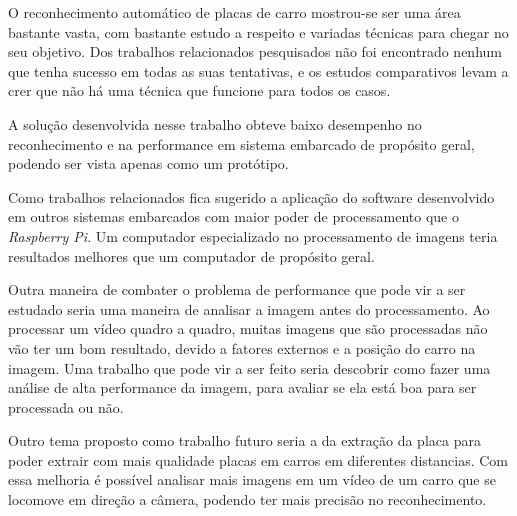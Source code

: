 O reconhecimento automático de placas de carro mostrou-se ser uma área bastante vasta, com bastante estudo a respeito e variadas técnicas para chegar no seu objetivo. Dos trabalhos relacionados pesquisados não foi encontrado nenhum que tenha sucesso em todas as suas tentativas, e os estudos comparativos levam a crer que não há uma técnica que funcione para todos os casos. 

A solução desenvolvida nesse trabalho obteve baixo desempenho no reconhecimento e na performance em sistema embarcado de propósito geral, podendo ser vista apenas como um protótipo. 

Como trabalhos relacionados fica sugerido a aplicação do software desenvolvido em outros sistemas embarcados com maior poder de processamento que o \emph{Raspberry Pi}. Um computador especializado no processamento de imagens teria resultados melhores que um computador de propósito geral.

Outra maneira de combater o problema de performance que pode vir a ser estudado seria uma maneira de analisar a imagem antes do processamento. Ao processar um vídeo quadro a quadro, muitas imagens que são processadas não vão ter um bom resultado, devido a fatores externos e a posição do carro na imagem. Uma trabalho que pode vir a ser feito seria descobrir como fazer uma análise de alta performance da imagem, para avaliar se ela está boa para ser processada ou não.

Outro tema proposto como trabalho futuro seria a da extração da placa para poder extrair com mais qualidade placas em carros em diferentes distancias. Com essa melhoria é possível analisar mais imagens em um vídeo de um carro que se locomove em direção a câmera, podendo ter mais precisão no reconhecimento.